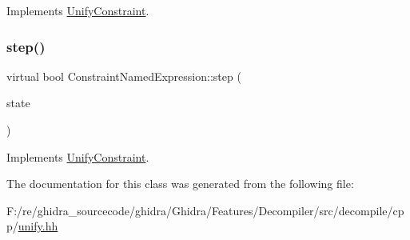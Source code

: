 Implements \mbox{\hyperlink{class_unify_constraint_a774f6a611a96384766cb8e8d8f5ff41f}{Unify\+Constraint}}.

\mbox{\label{class_constraint_named_expression_a630676872d5064310afad5d63fa5aea8}} 
\subsubsection{\texorpdfstring{step()}{step()}}
{\footnotesize\ttfamily virtual bool Constraint\+Named\+Expression\+::step (\begin{DoxyParamCaption}\item[{\mbox{\hyperlink{class_unify_state}{Unify\+State}} \&}]{state }\end{DoxyParamCaption})\hspace{0.3cm}{\ttfamily [virtual]}}



Implements \mbox{\hyperlink{class_unify_constraint_ad9ab4ad91037f96bf803735d414d212d}{Unify\+Constraint}}.



The documentation for this class was generated from the following file\+:\begin{DoxyCompactItemize}
\item 
F\+:/re/ghidra\+\_\+sourcecode/ghidra/\+Ghidra/\+Features/\+Decompiler/src/decompile/cpp/\mbox{\hyperlink{unify_8hh}{unify.\+hh}}\end{DoxyCompactItemize}
